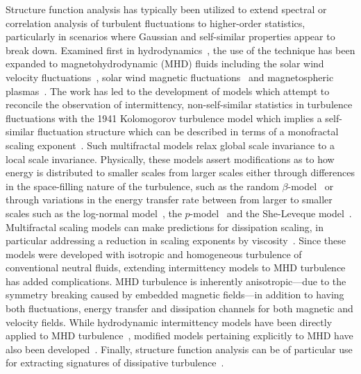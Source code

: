 \documentclass[aps,prl,amsmath,amssymb,reprint,superscriptaddress]{revtex4-1} %
\begin{document}
Structure function analysis has typically been utilized to extend spectral or correlation analysis of turbulent fluctuations to higher-order statistics, particularly in scenarios where Gaussian and self-similar properties appear to break down. Examined first in hydrodynamics~\cite{frisch1995}, the use of the technique has been expanded to magnetohydrodynamic (MHD) fluids including the solar wind velocity fluctuations~\cite{burlaga1991}, solar wind magnetic fluctuations~\cite{burlaga1992} and magnetospheric plasmas~\cite{consolini1996,hnat2003}. The work has led to the development of models which attempt to reconcile the observation of intermittency, non-self-similar statistics in turbulence fluctuations with the 1941 Kolomogorov turbulence model which implies a self-similar fluctuation structure which can be described in terms of a monofractal scaling exponent~\cite{kolmogorov1941,frisch1995}. Such multifractal models relax global scale invariance to a local scale invariance. Physically, these models assert modifications as to how energy is distributed to smaller scales from larger scales either through differences in the space-filling nature of the turbulence, such as the random $\beta$-model~\cite{frisch1978} or through variations in the energy transfer rate between from larger to smaller scales such as the log-normal model~\cite{kolmogorov1962}, the $p$-model~\cite{meneveau1987} and the She-Leveque model~\cite{she1994,dubrulle1994}. Multifractal scaling models can make predictions for dissipation scaling, in particular addressing a reduction in scaling exponents by viscosity~\cite{frisch1991,chevillard2005}. Since these models were developed with isotropic and homogeneous turbulence of conventional neutral fluids, extending intermittency models to MHD turbulence has added complications. MHD turbulence is inherently anisotropic---due to the symmetry breaking caused by embedded magnetic fields---in addition to having both fluctuations, energy transfer and dissipation channels for both magnetic and velocity fields. While hydrodynamic intermittency models have been directly applied to MHD turbulence~\cite{burlaga1991,pagel2002}, modified models pertaining explicitly to MHD have also been developed~\cite{carbone1993,muller2000,biskamp2000,boldyrev2002,cho2003}. Finally, structure function analysis can be of particular use for extracting signatures of dissipative turbulence~\cite{frisch1991,cho2003,chevillard2005,alexandrova2008,kiyani2009,kiyani2013}.
\end{document}
